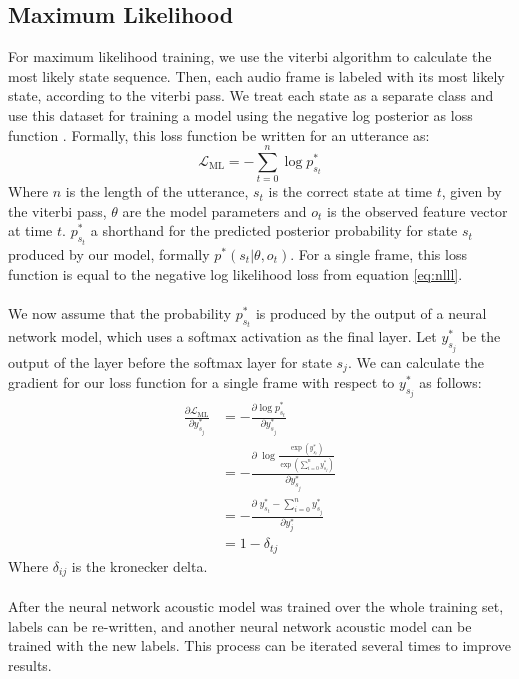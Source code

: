 \subsection{Maximum Likelihood}
For maximum likelihood training, we use the viterbi algorithm to calculate the most likely state sequence. Then, each audio frame is labeled with its most likely state, according to the viterbi pass. We treat each state as a separate class and use this dataset for training a model using the negative log posterior as loss function \cite{kitasr2018stueker}. Formally, this loss function be written for an utterance as:
\[
\mathcal{L}_{\text{ML}} = - \sum_{t = 0}^{n} \log p^*_{s_t}
\]
Where $n$ is the length of the utterance, $s_t$ is the correct state at time $t$, given by the viterbi pass, $\theta$ are the model parameters and $o_t$ is the observed feature vector at time $t$. $p^*_{s_t}$ a shorthand for the predicted posterior probability for state $s_t$ produced by our model, formally $p^*(s_t|\theta,o_t)$. For a single frame, this loss function is equal to the negative log likelihood loss from equation \ref{eq:nlll}. \\ \\
We now assume that the probability $p^*_{s_t}$ is produced by the output of a neural network model, which uses a softmax activation as the final layer. Let $y^*_{s_j}$ be the output of the layer before the softmax layer for state $s_j$. We can calculate the gradient for our loss function for a single frame with respect to $y^*_{s_j}$ as follows:
\begin{align*}
\frac{\partial\mathcal{L}_\text{ML}}{\partial y^*_{s_j}} &= -\frac{\partial \log p^*_{s_t}}{\partial y^*_{s_j}} \\
&= -\frac{\partial \; \log \frac{\exp \left(y^*_{s_t}\right)}{\exp\left(\sum_{i = 0}^{n} y^*_{s_j}\right)}}{\partial y^*_{s_j}} \\
&= -\frac{\partial \; y^*_{s_t} - \sum_{i = 0}^{n} y^*_{s_j}}{\partial y^*_j} \\
&= 1 - \delta_{tj}
\end{align*}
Where $\delta_{ij}$ is the kronecker delta. \\ \\
After the neural network acoustic model was trained over the whole training set, labels can be re-written, and another neural network acoustic model can be trained with the new labels. This process can be iterated several times to improve results. 
